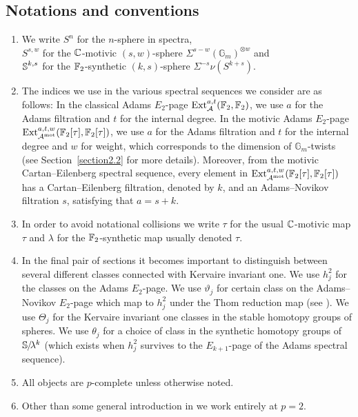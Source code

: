 \subsection{Notations and conventions}\hfill

\begin{enumerate}
\item We write $S^n$ for the $n$-sphere in spectra, \\
  $S^{s,w}$ for the $\mathbb{C}$-motivic $(s,w)$-sphere $\Sigma^{s-w}(\mathbb{G}_m)^{\otimes w}$ and \\
  $\operatorname{\mathbb{S}}^{k,s}$ for the $\operatorname{\mathbb{F}}_2$-synthetic $(k,s)$-sphere $\Sigma^{-s}\nu( S^{k+s} )$.
\item The indices we use in the various spectral sequences we consider are as follows:
  In the classical Adams $E_2$-page $\operatorname{\mathrm{Ext}}_{\operatorname{\mathcal{A}}}^{a,t}(\mathbb{F}_2, \mathbb{F}_2)$, we use $a$ for the Adams filtration and $t$ for the internal degree.
  In the motivic Adams $E_2$-page $\operatorname{\mathrm{Ext}}^{a,t,w}_{\operatorname{\mathcal{A}}^\textup{mot}}(\mathbb{F}_2[\tau], \mathbb{F}_2[\tau])$, we use $a$ for the Adams filtration and $t$ for the internal degree and $w$ for weight, which corresponds to the dimension of $\mathbb{G}_m$-twists (see Section~\ref{section2.2} for more details).
  Moreover, from the motivic Cartan--Eilenberg spectral sequence, every element in $\operatorname{\mathrm{Ext}}^{a,t,w}_{\operatorname{\mathcal{A}}^\textup{mot}}(\mathbb{F}_2[\tau], \mathbb{F}_2[\tau])$ has a Cartan--Eilenberg filtration, denoted by $k$, and an Adams--Novikov filtration $s$, satisfying that $a = s+k$.
\item In order to avoid notational collisions we write $\tau$ for the usual $\mathbb{C}$-motivic map $\tau$ and $\lambda$ for the $\operatorname{\mathbb{F}}_2$-synthetic map usually denoted $\tau$.
\item In the final pair of sections it becomes important to distinguish between several different classes connected with Kervaire invariant one. 
  We use $h_j^2$ for the classes on the Adams $E_2$-page.
  We use $\vartheta_j$ for certain class on the Adams--Novikov $E_2$-page which map to $h_j^2$ under the Thom reduction map (see ).
  We use $\Theta_j$ for the Kervaire invariant one classes in the stable homotopy groups of spheres.
  We use $\theta_j$ for a choice of class in the synthetic homotopy groups of $\operatorname{\mathbb{S}}\hspace{-2.2pt}/\!\lambda^k$ (which exists when $h_j^2$ survives to the $E_{k+1}$-page of the Adams spectral sequence).
\item All objects are $p$-complete unless otherwise noted.
\item Other than some general introduction in  we work entirely at $p=2$.
\end{enumerate}
  
